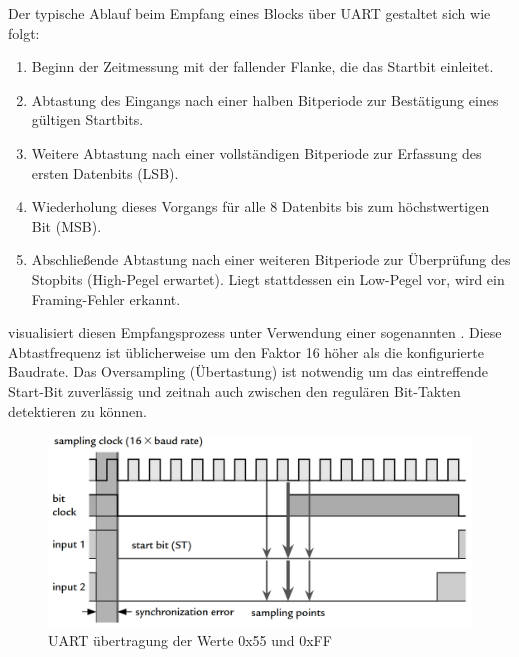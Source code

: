 \newpage
Der typische Ablauf beim Empfang eines Blocks \"uber UART gestaltet sich wie folgt:

\begin{enumerate}
	\item Beginn der Zeitmessung mit der fallender Flanke, die das Startbit einleitet.
	\item Abtastung des Eingangs nach einer halben Bitperiode zur Best\"atigung eines g\"ultigen Startbits.
	\item Weitere Abtastung nach einer vollst\"andigen Bitperiode zur Erfassung des ersten Datenbits (LSB).
	\item Wiederholung dieses Vorgangs f\"ur alle 8 Datenbits bis zum h\"ochstwertigen Bit (MSB).
	\item Abschlie{\ss}ende Abtastung nach einer weiteren Bitperiode zur \"Uberpr\"ufung des Stopbits (High-Pegel erwartet). Liegt stattdessen ein Low-Pegel vor, wird ein Framing-Fehler erkannt.
\end{enumerate}

 visualisiert diesen Empfangsprozess unter Verwendung einer sogenannten . Diese Abtastfrequenz ist \"ublicherweise um den Faktor 16 h\"oher als die konfigurierte Baudrate. Das Oversampling (\"Ubertastung) ist notwendig um das eintreffende Start-Bit zuverl\"assig und zeitnah auch zwischen den regul\"aren Bit-Takten detektieren zu k\"onnen.

\begin{figure}[h!]
	\centering
	\includegraphics[width=1.0\textwidth]{../Bilder/uart_protocoll.png}
	\caption{UART \"ubertragung der Werte 0x55 und 0xFF\\}
	\label{fig:uart_uebertragung}
\end{figure}

